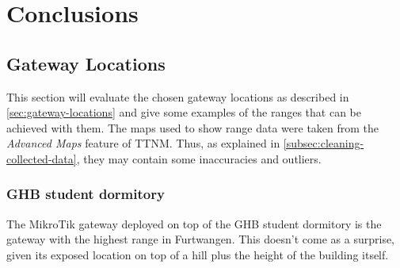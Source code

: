 \chapter{Conclusions}

\section{Gateway Locations}

This section will evaluate the chosen gateway locations as described in \cref{sec:gateway-locations} and give some examples of the ranges that can be achieved with them.
The maps used to show range data were taken from the \emph{Advanced Maps} feature of \ac{TTNM}.
Thus, as explained in \cref{subsec:cleaning-collected-data}, they may contain some inaccuracies and outliers.

\subsection{\acf{GHB} student dormitory}\label{subsec:ghb-student-dormitory-range-results}

The MikroTik gateway deployed on top of the \ac{GHB} student dormitory is the gateway with the highest range in Furtwangen.
This doesn't come as a surprise, given its exposed location on top of a hill plus the height of the building itself.

